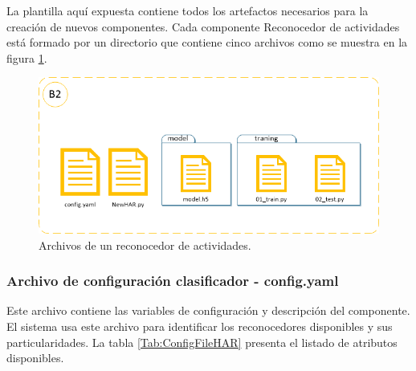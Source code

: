         La plantilla aquí expuesta contiene todos los artefactos necesarios para la creación de nuevos componentes. Cada componente Reconocedor de actividades está formado por un directorio que contiene cinco archivos como se muestra en la figura \ref{fig:TplHARFiles}.
    
        \begin{figure}[ht!]
        	\centering
        	\includegraphics[width=0.8\linewidth]{imgs/03-Architecture/03-TplHARFiles.png}
        	\caption[Archivos de un reconocedor de actividades]{Archivos de un reconocedor de actividades.}
    	    \label{fig:TplHARFiles}
        \end{figure}%
        
        \subsubsection{Archivo de configuración clasificador - config.yaml}
        \label{sub2:ConfigFileHAR}
            Este archivo contiene las variables de configuración y descripción del componente. El sistema usa este archivo para identificar los reconocedores disponibles y sus particularidades. La tabla \ref{Tab:ConfigFileHAR} presenta el listado de atributos disponibles.

